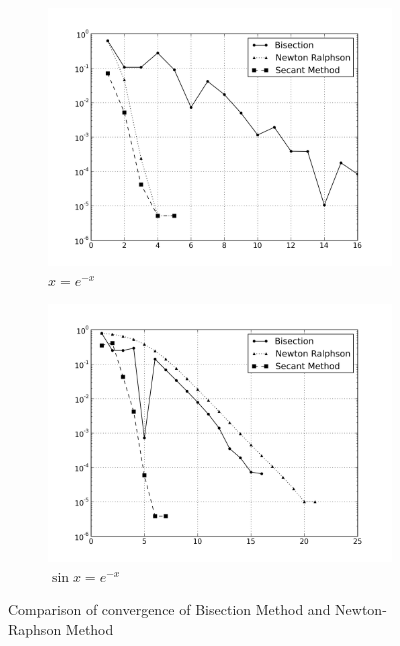 \documentclass[12,a4paper]{article}
\begin{document}
\begin{figure}[h!]
\begin{subfigure}[t]{0.49\textwidth}
            \includegraphics[width=\textwidth]{plots/root5.png}
            \caption{$x=e^{-x}$}
            \label{fig:root5}
        \end{subfigure}
        \begin{subfigure}[t]{0.49\textwidth}
            \includegraphics[width=\textwidth]{plots/root6.png}
            \caption{$\sin x=e^{-x}$}
            \label{fig:root6}
        \end{subfigure}
        \caption{Comparison of convergence of Bisection Method and Newton-Raphson Method}
    \end{figure}
\end{document}
